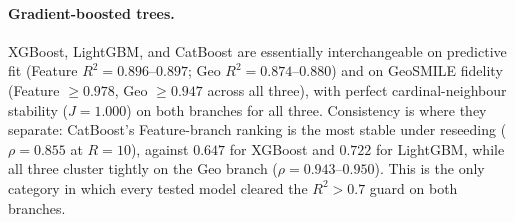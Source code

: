 \begin{table}[htbp]
\centering
\caption{Predictive fit and GeoSMILE attribution quality by candidate model and category (seed 42, Feature $N{=}1{,}024$, Geo $N{=}4{,}000$). ``--'' marks a joint Feature+Geo diagnostic (stability) withheld because the model's Geo branch failed the $R^2>0.7$ guard.}
\label{tab:hull_model_screening}
\end{table}

\paragraph{Gradient-boosted trees.} XGBoost, LightGBM, and CatBoost are
essentially interchangeable on predictive fit (Feature $R^2 = 0.896$--$0.897$;
Geo $R^2 = 0.874$--$0.880$) and on GeoSMILE fidelity (Feature $\ge 0.978$, Geo
$\ge 0.947$ across all three), with perfect cardinal-neighbour stability
($J=1.000$) on both branches for all three. Consistency is where they
separate: CatBoost's Feature-branch ranking is the most stable under reseeding
($\rho=0.855$ at $R{=}10$), against $0.647$ for XGBoost and $0.722$ for
LightGBM, while all three cluster tightly on the Geo branch
($\rho=0.943$--$0.950$). This is the only category in which every tested
model cleared the $R^2 > 0.7$ guard on both branches.

